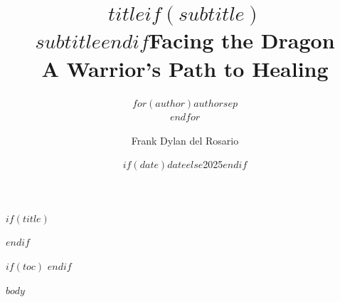 \documentclass[11pt,openright,twoside]{book}
\title{$title$$if(subtitle)$\\[0.5em]\large $subtitle$$endif$}
\title{Facing the Dragon\\[0.5em]\large A Warrior's Path to Healing}
\author{$for(author)$$author$$sep$ \\ $endfor$}
\author{Frank Dylan del Rosario}
\date{$if(date)$$date$$else$2025$endif$}
\begin{document}
$if(title)$
\frontmatter
\maketitle
$endif$

$if(toc)$
\tableofcontents
$endif$

\mainmatter

$body$
\end{document}
